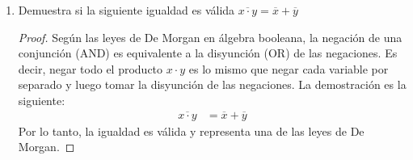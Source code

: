 \documentclass{article}
\begin{document}
\begin{enumerate}
\begin{enumerate}
\begin{proof}
\begin{align*}
                                                &= xz + y\overline{x}z + yz \\
                                                &= xz + yz \quad \text{(ya que $y\overline{x}z$ es absorbido por $yz$)}
            \end{align*}
            Por otro lado, $(x + y)(\overline{x} + z)$ se expande como:
            \begin{align*}
                (x + y)(\overline{x} + z) &= x\overline{x} + xz + y\overline{x} + yz \\
                                          &= 0 + xz + y\overline{x} + yz \\
                                          &= xz + yz
            \end{align*}
            Por lo tanto, $(x + y)(\overline{x} + z)(y + z) = (x + y)(\overline{x} + z)$ es una igualdad válida.
        \end{proof}
      \item Demuestra si la siguiente igualdad es válida $\overline{x \cdot y} = \overline{x} + \overline{y}$
        \begin{proof}
            Según las leyes de De Morgan en álgebra booleana, la negación de una conjunción (AND) es equivalente a la disyunción (OR) de las negaciones. Es decir, negar todo el producto \(x \cdot y\) es lo mismo que negar cada variable por separado y luego tomar la disyunción de las negaciones. La demostración es la siguiente:
            \begin{align*}
                \overline{x \cdot y} &= \overline{x} + \overline{y}
            \end{align*}
            Por lo tanto, la igualdad es válida y representa una de las leyes de De Morgan.
        \end{proof}

    \end{enumerate}
\end{enumerate}
\end{document}

